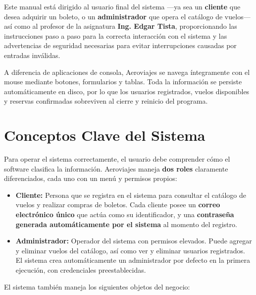 \documentclass[12pt, letterpaper]{article}
\begin{document}
	Este manual está dirigido al usuario final del sistema —ya sea un \textbf{cliente} que desea adquirir un boleto, o un \textbf{administrador} que opera el catálogo de vuelos— así como al profesor de la asignatura \textbf{Ing. Edgar Tista}, proporcionando las instrucciones paso a paso para la correcta interacción con el sistema y las advertencias de seguridad necesarias para evitar interrupciones causadas por entradas inválidas.
	
	A diferencia de aplicaciones de consola, Aeroviajes se navega íntegramente con el mouse mediante botones, formularios y tablas. Toda la información se persiste automáticamente en disco, por lo que los usuarios registrados, vuelos disponibles y reservas confirmadas sobreviven al cierre y reinicio del programa.
	
	\section{Conceptos Clave del Sistema}
	Para operar el sistema correctamente, el usuario debe comprender cómo el software clasifica la información. Aeroviajes maneja \textbf{dos roles} claramente diferenciados, cada uno con un menú y permisos propios:
	
	\begin{itemize}
		\item \textbf{Cliente:} Persona que se registra en el sistema para consultar el catálogo de vuelos y realizar compras de boletos. Cada cliente posee un \textbf{correo electrónico único} que actúa como su identificador, y una \textbf{contraseña generada automáticamente por el sistema} al momento del registro.
		\item \textbf{Administrador:} Operador del sistema con permisos elevados. Puede agregar y eliminar vuelos del catálogo, así como ver y eliminar usuarios registrados. El sistema crea automáticamente un administrador por defecto en la primera ejecución, con credenciales preestablecidas.
	\end{itemize}
	
	El sistema también maneja los siguientes objetos del negocio:
	
\end{document}

